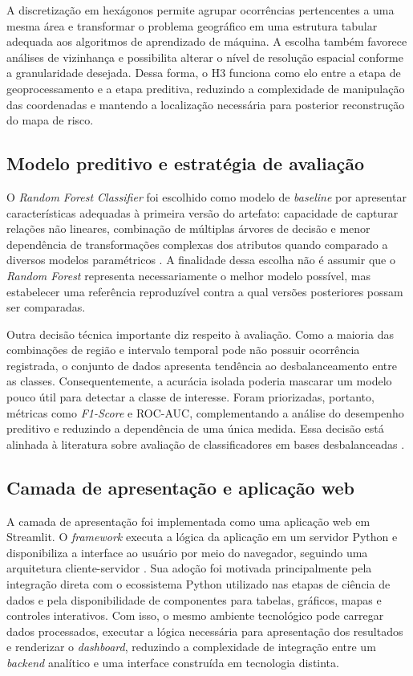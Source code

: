 \documentclass[12pt]{article}
\begin{document}
A discretização em hexágonos permite agrupar ocorrências pertencentes a uma mesma área e transformar o problema geográfico em uma estrutura tabular adequada aos algoritmos de aprendizado de máquina. A escolha também favorece análises de vizinhança e possibilita alterar o nível de resolução espacial conforme a granularidade desejada. Dessa forma, o H3 funciona como elo entre a etapa de geoprocessamento e a etapa preditiva, reduzindo a complexidade de manipulação das coordenadas e mantendo a localização necessária para posterior reconstrução do mapa de risco.

\subsection{Modelo preditivo e estratégia de avaliação}
O \textit{Random Forest Classifier} foi escolhido como modelo de \textit{baseline} por apresentar características adequadas à primeira versão do artefato: capacidade de capturar relações não lineares, combinação de múltiplas árvores de decisão e menor dependência de transformações complexas dos atributos quando comparado a diversos modelos paramétricos \cite{breiman2001}. A finalidade dessa escolha não é assumir que o \textit{Random Forest} representa necessariamente o melhor modelo possível, mas estabelecer uma referência reproduzível contra a qual versões posteriores possam ser comparadas.

Outra decisão técnica importante diz respeito à avaliação. Como a maioria das combinações de região e intervalo temporal pode não possuir ocorrência registrada, o conjunto de dados apresenta tendência ao desbalanceamento entre as classes. Consequentemente, a acurácia isolada poderia mascarar um modelo pouco útil para detectar a classe de interesse. Foram priorizadas, portanto, métricas como \textit{F1-Score} e ROC-AUC, complementando a análise do desempenho preditivo e reduzindo a dependência de uma única medida. Essa decisão está alinhada à literatura sobre avaliação de classificadores em bases desbalanceadas \cite{saito2015}.

\subsection{Camada de apresentação e aplicação web}
A camada de apresentação foi implementada como uma aplicação web em Streamlit. O \textit{framework} executa a lógica da aplicação em um servidor Python e disponibiliza a interface ao usuário por meio do navegador, seguindo uma arquitetura cliente-servidor \cite{streamlit2026}. Sua adoção foi motivada principalmente pela integração direta com o ecossistema Python utilizado nas etapas de ciência de dados e pela disponibilidade de componentes para tabelas, gráficos, mapas e controles interativos. Com isso, o mesmo ambiente tecnológico pode carregar dados processados, executar a lógica necessária para apresentação dos resultados e renderizar o \textit{dashboard}, reduzindo a complexidade de integração entre um \textit{backend} analítico e uma interface construída em tecnologia distinta.
\end{document}
